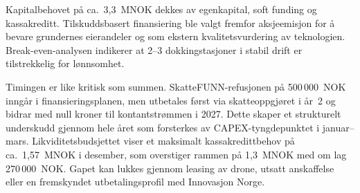 Kapitalbehovet på ca.\ 3,3~MNOK dekkes av egenkapital, soft funding og kassakreditt. Tilskuddsbasert finansiering ble valgt fremfor aksjeemisjon for å bevare grundernes eierandeler og som ekstern kvalitetsvurdering av teknologien. Break-even-analysen indikerer at 2--3 dokkingstasjoner i stabil drift er tilstrekkelig for lønnsomhet.

Timingen er like kritisk som summen. SkatteFUNN-refusjonen på 500\,000~NOK inngår i finansieringsplanen, men utbetales først via skatteoppgjøret i år~2 og bidrar med null kroner til kontantstrømmen i 2027. Dette skaper et strukturelt underskudd gjennom hele året som forsterkes av CAPEX-tyngdepunktet i januar–mars. Likviditetsbudsjettet viser et maksimalt kassakredittbehov på ca.\ 1,57~MNOK i desember, som overstiger rammen på 1,3~MNOK med om lag 270\,000~NOK. Gapet kan lukkes gjennom leasing av drone, utsatt anskaffelse eller en fremskyndet utbetalingsprofil med Innovasjon Norge.